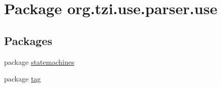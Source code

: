 \hypertarget{namespaceorg_1_1tzi_1_1use_1_1parser_1_1use}{\section{Package org.\-tzi.\-use.\-parser.\-use}
\label{namespaceorg_1_1tzi_1_1use_1_1parser_1_1use}
}
\subsection*{Packages}
\begin{DoxyCompactItemize}
\item 
package \hyperlink{namespaceorg_1_1tzi_1_1use_1_1parser_1_1use_1_1statemachines}{statemachines}
\item 
package \hyperlink{namespaceorg_1_1tzi_1_1use_1_1parser_1_1use_1_1tag}{tag}
\end{DoxyCompactItemize}
